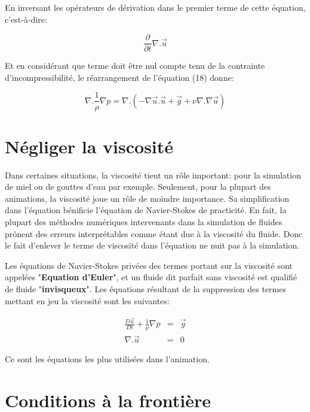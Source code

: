 \documentclass[11pt]{report}
\begin{document}
En inversant les opérateurs de dérivation dans le premier terme de cette équation, c'est-à-dire:

\begin{equation}
\frac{\partial }{\partial t}\nabla .\overrightarrow{u}
\end{equation}

Et en considérant que terme doit être nul compte tenu de la contrainte d'incompressibilité, le réarrangement de l'équation (18) donne:

\begin{equation}
\nabla . \frac{1}{\rho}\nabla p = \nabla . (-\nabla \overrightarrow{u} . \overrightarrow{u}+ \overrightarrow{g} + \nu \nabla . \nabla \overrightarrow{u}) 
\end{equation}


\section{Négliger la viscosité}	

Dans certaines situations, la viscosité tient un rôle important: pour la simulation de miel ou de gouttes d'eau par exemple. Seulement, pour la plupart des animations, la viscosité joue un rôle de moindre importance. Sa simplification dans l'équation bénificie l'équation de Navier-Stokes de practicité. En fait, la plupart des méthodes numériques intervenants dans la simulation de fluides prônent des erreurs interprétables comme étant due à la viscosité du fluide. Donc le fait d'enlever le terme de viscosité dans l'équation ne nuit pas à la simulation. 

Les équations de Navier-Stokes privées des termes portant sur la viscosité sont appelées "\textbf{Equation d'Euler}", et un fluide dit parfait sans viscosité est qualifié de fluide "\textbf{invisqueux}". Les équations résultant de la suppression des termes mettant en jeu la viscosité sont les suivantes:

\begin{eqnarray}
\frac{D\overrightarrow{u}}{Dt} + \frac{1}{\rho} \nabla p & = & \overrightarrow{g} \\
\nabla . \overrightarrow{u} & = & 0
\end{eqnarray}

Ce sont les équations les plus utilisées dans l'animation.

\section{Conditions à la frontière}	
\end{document}

